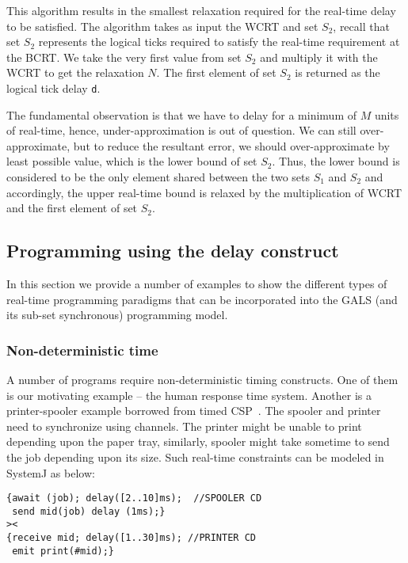 This algorithm results in the smallest relaxation required for the
real-time delay to be satisfied. The algorithm takes as input the WCRT
and set $S_2$, recall that set $S_2$ represents the logical ticks
required to satisfy the real-time requirement at the BCRT. We take the
very first value from set $S_2$ and multiply it with the WCRT to get the
relaxation $N$. The first element of set $S_2$ is returned as the
logical tick delay \texttt{d}.

The fundamental observation is that we have to delay for a minimum of
$M$ units of real-time, hence, under-approximation is out of
question. We can still over-approximate, but to reduce the resultant
error, we should over-approximate by least possible value, which is the
lower bound of set $S_2$. Thus, the lower bound is considered to be the
only element shared between the two sets $S_1$ and $S_2$ and
accordingly, the upper real-time bound is relaxed by the multiplication
of WCRT and the first element of set $S_2$.


\subsection{Programming using the delay construct}
\label{sec:progr-using-delay}

In this section we provide a number of examples to show the different
types of real-time programming paradigms that can be incorporated into
the GALS (and its sub-set synchronous) programming model.

\subsubsection{Non-deterministic time}
\label{sec:non-determ-time}

A number of programs require non-deterministic timing constructs. One of
them is our motivating example -- the human response time
system. Another is a printer-spooler example borrowed from timed
CSP~\cite{Schneider:1999:CRT:555233}. The spooler and printer need to
synchronize using channels. The printer might be unable to print
depending upon the paper tray, similarly, spooler might take sometime to
send the job depending upon its size. Such real-time constraints can be
modeled in SystemJ as below:

\begin{scriptsize}
  
\begin{verbatim}
{await (job); delay([2..10]ms);  //SPOOLER CD
 send mid(job) delay (1ms);}
><
{receive mid; delay([1..30]ms); //PRINTER CD
 emit print(#mid);}
\end{verbatim}
\end{scriptsize}

